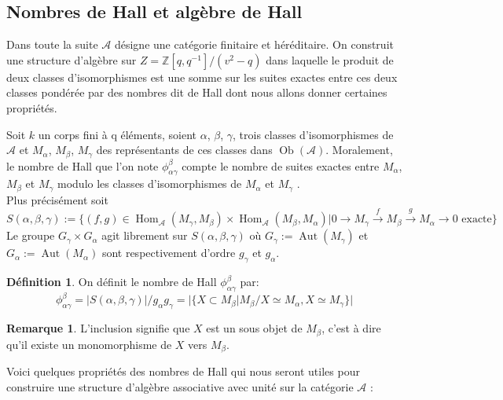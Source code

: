 \documentclass[12pt]{article}
\DeclareMathOperator{\aut}{Aut}
\DeclareMathOperator{\Hom}{Hom}
\DeclareMathOperator{\ob}{Ob}
\theoremstyle{definition}
\newtheorem{rem}{Remarque}[section]
\newtheorem{Def}{Définition}[section]
\begin{document}
\subsection{Nombres de Hall et algèbre de Hall}
Dans toute la suite $\mathcal{A}$ désigne une catégorie finitaire et héréditaire. On construit une structure d'algèbre sur $Z=\mathbb{Z}[q,q^{-1}]/(v^2-q)$ dans laquelle le produit de deux classes d'isomorphismes est une somme sur les suites exactes entre ces deux classes pondérée par des nombres dit de Hall dont nous allons donner certaines propriétés.\vspace{0.5cm}

Soit $k$ un corps fini à q éléments, soient $\alpha$, $\beta$, $\gamma$, trois classes d'isomorphismes de $\mathcal{A}$ et $M_{\alpha}$, $M_{\beta}$, $M_{\gamma}$ des représentants de ces classes dans $\ob(\mathcal{A})$. Moralement, le nombre de Hall que l'on note $\phi^{\beta}_{\alpha\gamma}$ compte le nombre de suites exactes entre $M_{\alpha}$, $M_{\beta}$ et $M_{\gamma}$ modulo les classes d'isomorphismes de $M_{\alpha}$ et $M_{\gamma}$ .\\
Plus précisément soit $$S(\alpha,\beta,\gamma):=\{(f,g)\in\Hom_{\mathcal{A}}(M_{\gamma},M_{\beta})\times\Hom_{\mathcal{A}}(M_{\beta}, M_{\alpha}) | 0\longrightarrow M_{\gamma}\overset{f} \longrightarrow M_{\beta}\overset{g}\longrightarrow M_{\alpha}\longrightarrow 0\mbox{ exacte}\}  $$ Le groupe $G_{\gamma}\times G_{\alpha}$ agit librement sur $S(\alpha,\beta,\gamma)$ où $G_{\gamma}:=\aut(M_{\gamma})$ et $G_{\alpha}:=\aut(M_{\alpha})$ sont respectivement d'ordre $g_{\gamma}$ et $g_{\alpha}$. 
\begin{Def} On définit le nombre de Hall $\phi^{\beta}_{\alpha\gamma}$ par:  $$\phi^{\beta}_{\alpha\gamma}=|S(\alpha,\beta,\gamma)|/g_{\alpha}g_{\gamma}=\vert\{X\subset M_{\beta}|M_{\beta}/X\simeq M_{\alpha}, X\simeq M_{\gamma}\}\vert$$ 
\end{Def}
\begin{rem}\textnormal{L'inclusion signifie que $X$ est un sous objet de $M_{\beta}$, c'est à dire qu'il existe un monomorphisme de $X$ vers $M_{\beta}$.}
\end{rem} 
Voici quelques propriétés des nombres de Hall qui nous seront utiles pour construire une structure d'algèbre associative avec unité sur la catégorie $\mathcal{A}$ :
\end{document}

